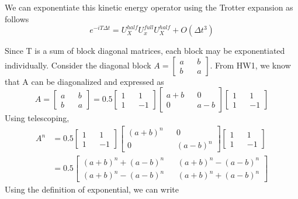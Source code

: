 \documentclass[11pt, oneside]{article}   	%
\begin{document}
We can exponentiate this kinetic energy operator using the Trotter expansion as follows
\begin{equation}
 e^{-iT \Delta t} = U_X^{half} U_x^{full} U_X^{half} + O(\Delta t^3)
\end{equation}

Since T is a sum of block diagonal matrices, each block may be exponentiated individually.
Consider the diagonal block $A = \begin{bmatrix}
a && b \\
b && a
\end{bmatrix}$. From HW1, we know that  A can be diagonalized and expressed as
\begin{equation}
A = \begin{bmatrix}
a && b \\
b && a
\end{bmatrix} = 0.5 \begin{bmatrix}
1 && 1 \\
1 && -1
\end{bmatrix} \begin{bmatrix}
a+b && 0 \\
0 && a-b
\end{bmatrix} \begin{bmatrix}
1 && 1 \\
1 && -1
\end{bmatrix}
\end{equation}
Using telescoping,
\begin{align}
A^n &= 0.5 \begin{bmatrix}
1 && 1 \\
1 && -1
\end{bmatrix} \begin{bmatrix}
(a+b)^n && 0 \\
0 && (a-b)^n
\end{bmatrix} \begin{bmatrix}
1 && 1 \\
1 && -1
\end{bmatrix} \\
&= 0.5\begin{bmatrix}
(a+b)^n + (a-b)^n && (a+b)^n - (a-b)^n \\
(a+b)^n - (a-b)^n && (a+b)^n + (a-b)^n
\end{bmatrix}
\end{align}
Using the definition of exponential, we can write
\end{document}
